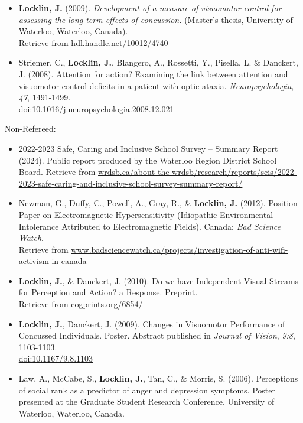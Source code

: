 \documentclass[10pt]{article}
\begin{document}
\begin{itemize}
\item
  \textbf{Locklin, J.} (2009). \emph{Development of a measure of
  visuomotor control for assessing the long-term effects of concussion.}
  (Master's thesis, University of Waterloo, Waterloo, Canada).\\
  Retrieve from
  \href{http://hdl.handle.net/10012/4740}{hdl.handle.net/10012/4740}
\item
  Striemer, C., \textbf{Locklin, J.}, Blangero, A., Rossetti, Y.,
  Pisella, L. \& Danckert, J. (2008). Attention for action? Examining
  the link between attention and visuomotor control deficits in a
  patient with optic ataxia. \emph{Neuropsychologia}, \emph{47},
  1491-1499.\\
  \href{http://dx.doi.org/10.1016/j.neuropsychologia.2008.12.021}{doi:10.1016/j.neuropsychologia.2008.12.021}
\end{itemize}

Non-Refereed:

\begin{itemize}
\item
  2022-2023 Safe, Caring and Inclusive School Survey -- Summary Report
  (2024). Public report produced by the Waterloo Region District School
  Board. Retrieve from
  \href{https://www.wrdsb.ca/about-the-wrdsb/research/reports/scis/2022-2023-safe-caring-and-inclusive-school-survey-summary-report/}{wrdsb.ca/about-the-wrdsb/research/reports/scis/2022-2023-safe-caring-and-inclusive-school-survey-summary-report/}
\item
  Newman, G., Duffy, C., Powell, A., Gray, R., \& \textbf{Locklin, J.}
  (2012). Position Paper on Electromagnetic Hypersensitivity (Idiopathic
  Environmental Intolerance Attributed to Electromagnetic Fields).
  Canada: \emph{Bad Science Watch}.\\
  Retrieve from
  \href{http://www.badsciencewatch.ca/projects/investigation-of-anti-wifi-activism-in-canada}{www.badsciencewatch.ca/projects/investigation-of-anti-wifi-activism-in-canada}
\item
  \textbf{Locklin, J.}, \& Danckert, J. (2010). Do we have Independent
  Visual Streams for Perception and Action? a Response. Preprint.\\
  Retrieve from \href{http://cogprints.org/6854/}{cogprints.org/6854/}
\item
  \textbf{Locklin, J.}, Danckert, J. (2009). Changes in Visuomotor
  Performance of Concussed Individuals. Poster. Abstract published in
  \emph{Journal of Vision}, \emph{9:8}, 1103-1103.\\
  \href{http://dx.doi.org/10.1167/9.8.1103}{doi:10.1167/9.8.1103}
\item
  Law, A., McCabe, S., \textbf{Locklin, J.}, Tan, C., \& Morris, S.
  (2006). Perceptions of social rank as a predictor of anger and
  depression symptoms. Poster presented at the Graduate Student Research
  Conference, University of Waterloo, Waterloo, Canada.
\end{itemize}

\pagebreak[3]
\end{document}
